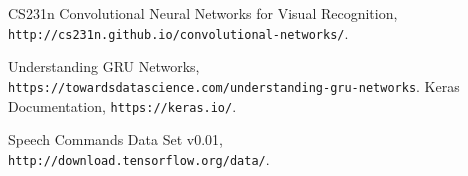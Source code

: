 \begin{thebibliography}{00}


 CS231n Convolutional Neural Networks for Visual Recognition, 
\texttt{http://cs231n.github.io/convolutional-networks/}.

 Understanding GRU Networks, \\\texttt{https://towardsdatascience.com/understanding-gru-networks}.
Keras Documentation, \texttt{https://keras.io/}.

 Speech Commands Data Set v0.01, \\\texttt{http://download.tensorflow.org/data/}.


\end{thebibliography}